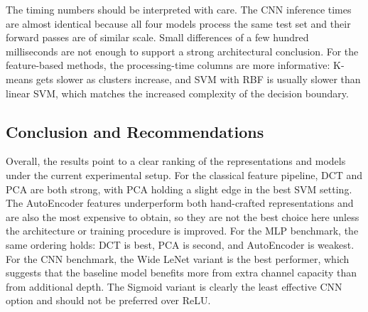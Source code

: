 The timing numbers should be interpreted with care. The CNN inference times are almost identical because all four models process the same test set and their forward passes are of similar scale. Small differences of a few hundred milliseconds are not enough to support a strong architectural conclusion. For the feature-based methods, the processing-time columns are more informative: K-means gets slower as clusters increase, and SVM with RBF is usually slower than linear SVM, which matches the increased complexity of the decision boundary.

\subsection{Conclusion and Recommendations}
Overall, the results point to a clear ranking of the representations and models under the current experimental setup. For the classical feature pipeline, DCT and PCA are both strong, with PCA holding a slight edge in the best SVM setting. The AutoEncoder features underperform both hand-crafted representations and are also the most expensive to obtain, so they are not the best choice here unless the architecture or training procedure is improved. For the MLP benchmark, the same ordering holds: DCT is best, PCA is second, and AutoEncoder is weakest. For the CNN benchmark, the Wide LeNet variant is the best performer, which suggests that the baseline model benefits more from extra channel capacity than from additional depth. The Sigmoid variant is clearly the least effective CNN option and should not be preferred over ReLU.


\endgroup